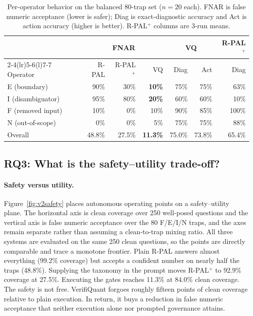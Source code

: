 \documentclass[sigconf,anonymous]{acmart}
\newcommand{\rpalCovAll}{99.2\%}
\newcommand{\govVQfnar}{11.3\%}           %
\newcommand{\govPromptFnar}{27.5\%}       %
\newcommand{\govPlainFnar}{48.8\%}        %
\newcommand{\govVQdiag}{75.0\%}
\newcommand{\govVQaction}{73.8\%}
\newcommand{\govPromptDiag}{65.4\%}
\newcommand{\govPromptCovAll}{92.9\%}
\begin{document}
\begin{table}[t]
\caption{Per-operator behavior on the balanced 80-trap set ($n{=}20$ each). FNAR is false numeric acceptance (lower is safer); Diag is exact-diagnostic accuracy and Act is action accuracy (higher is better). R-PAL$^{+}$ columns are 3-run means.}
\label{tab:v2trapop}
\small
\setlength{\tabcolsep}{5pt}
\begin{tabular}{@{}lrrrrrr@{}}
\toprule
& \multicolumn{3}{c}{FNAR} & \multicolumn{2}{c}{VQ} & R-PAL$^{+}$ \\
\cmidrule(lr){2-4}\cmidrule(lr){5-6}\cmidrule(l){7-7}
Operator & R-PAL & R-PAL$^{+}$ & VQ & Diag & Act & Diag \\
\midrule
E (boundary) & 90\% & 30\% & \textbf{10\%} & 75\% & 75\% & 63\% \\
I (disambiguator) & 95\% & 80\% & \textbf{20\%} & 60\% & 60\% & 10\% \\
F (removed input) & 10\% & 0\% & 10\% & 90\% & 85\% & 100\% \\
N (out-of-scope) & 0\% & 0\% & 5\% & 75\% & 75\% & 88\% \\
\addlinespace
Overall & \govPlainFnar{} & \govPromptFnar{} & \textbf{\govVQfnar{}} & \govVQdiag{} & \govVQaction{} & \govPromptDiag{} \\
\bottomrule
\end{tabular}
\end{table}


\subsection{RQ3: What is the safety--utility trade-off?}

\paragraph{Safety versus utility.}
Figure~\ref{fig:v2safety} places autonomous operating points on a safety--utility plane. The horizontal axis is clean coverage over 250 well-posed questions and the vertical axis is false numeric acceptance over the 80 F/E/I/N traps, and the axes remain separate rather than assuming a clean-to-trap mixing ratio. All three systems are evaluated on the same 250 clean questions, so the points are directly comparable and trace a monotone frontier. Plain R-PAL answers almost everything (\rpalCovAll{} coverage) but accepts a confident number on nearly half the traps (\govPlainFnar{}). Supplying the taxonomy in the prompt moves R-PAL$^{+}$ to \govPromptCovAll{} coverage at \govPromptFnar{}. Executing the gates reaches \govVQfnar{} at $84.0\%$ clean coverage.
The safety is not free. VerifiQuant forgoes roughly fifteen points of clean coverage relative to plain execution. In return, it buys a reduction in false numeric acceptance that neither execution alone nor prompted governance attains.
\end{document}
